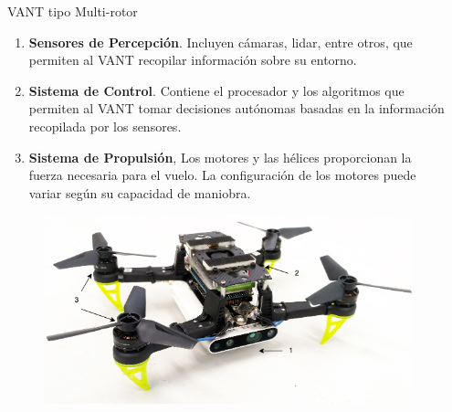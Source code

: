 \documentclass[final]{beamer}
\newlength{\sepwidth}
\newlength{\colwidth}
\newcommand{\separatorcolumn}{\begin{column}{\sepwidth}\end{column}}
\begin{document}
\begin{frame}[t]
\begin{columns}[t]
\separatorcolumn

\begin{column}{\colwidth}
  
  \begin{block}{\color{teal}VANT tipo Multi-rotor}
    \begin{enumerate}
      \item \textbf{Sensores de Percepción}. Incluyen cámaras, lidar, entre otros, que permiten al VANT recopilar información sobre su entorno.
      \item \textbf{Sistema de Control}. Contiene el procesador y los algoritmos que permiten al VANT tomar decisiones autónomas basadas en la información recopilada por los sensores.
      \item \textbf{Sistema de Propulsión}, Los motores y las hélices proporcionan la fuerza necesaria para el vuelo. La configuración de los motores puede variar según su capacidad de maniobra.
    \end{enumerate}

    \begin{figure}[t]
      \includegraphics[width=30cm]{images/drone_taxo.png}
      \centering
    \end{figure}
    
  \end{block}
  

\end{column}
\end{columns}
\end{frame}
\end{document}
